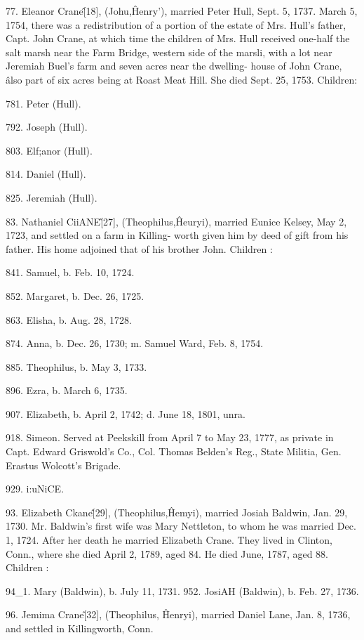 77. Eleanor Crane\^ [18], (Johu,\^ Henry'), married Peter 
Hull, Sept. 5, 1737. March 5, 1754, there was a redistribution 
of a portion of the estate of Mrs. Hull's father, Capt. John Crane, 
at which time the children of Mrs. Hull received one-half the salt 
marsh near the Farm Bridge, western side of the marsli, with a 
lot near Jeremiah Buel's farm and seven acres near the dwelling- 
house of John Crane, \^ also part of six acres being at Roast Meat 
Hill. She died Sept. 25, 1753. Children: 

781. Peter (Hull). 

792. Joseph (Hull). 

803. Elf;anor (Hull). 

814. Daniel (Hull). 

825. Jeremiah (Hull). 




83. Nathaniel CiiANE\^ [27], (Theophilus,\^ Heuryi), married 
Eunice Kelsey, May 2, 1723, and settled on a farm in Killing- 
worth given him by deed of gift from his father. His home 
adjoined that of his brother John. Children : 

841. Samuel, b. Feb. 10, 1724. 

852. Margaret, b. Dec. 26, 1725. 

863. Elisha, b. Aug. 28, 1728. 

874. Anna, b. Dec. 26, 1730; m. Samuel Ward, Feb. 8, 1754. 

885. Theophilus, b. May 3, 1733. 

896. Ezra, b. March 6, 1735. 

907. Elizabeth, b. April 2, 1742; d. June 18, 1801, unra. 

918. Simeon. Served at Peekskill from April 7 to May 23, 1777, as 
private in Capt. Edward Griswold's Co., Col. Thomas 
Belden's Reg., State Militia, Gen. Erastus Wolcott's Brigade. 

929. i:uNiCE. 

93. Elizabeth Ckane\^ [29], (Theophilus,\^ Hemyi), married 
Josiah Baldwin, Jan. 29, 1730. Mr. Baldwin's first wife was 
Mary Nettleton, to whom he was married Dec. 1, 1724. After her 
death he married Elizabeth Crane. They lived in Clinton, Conn., 
where she died April 2, 1789, aged 84. He died June, 1787, 
aged 88. Children : 

94\_1. Mary (Baldwin), b. July 11, 1731. 
952. JosiAH (Baldwin), b. Feb. 27, 1736. 

96. Jemima Crane\^ [32], (Theophilus, \^ Henryi), married 
Daniel Lane, Jan. 8, 1736, and settled in Killingworth, Conn. 

